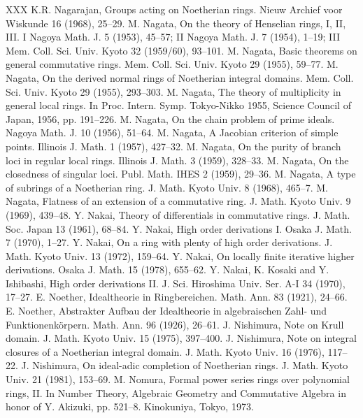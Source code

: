 \begin{thebibliography}{XXX}
 K.R. Nagarajan, Groups acting on Noetherian rings. Nieuw Archief voor Wiskunde 16 (1968), 25--29.
 M. Nagata, On the theory of Henselian rings, I, II, III. I Nagoya Math. J. 5 (1953), 45--57; II Nagoya Math. J. 7 (1954), 1--19; III Mem. Coll. Sci. Univ. Kyoto 32 (1959/60), 93--101.
 M. Nagata, Basic theorems on general commutative rings. Mem. Coll. Sci. Univ. Kyoto 29 (1955), 59--77.
 M. Nagata, On the derived normal rings of Noetherian integral domains. Mem. Coll. Sci. Univ. Kyoto 29 (1955), 293--303.
 M. Nagata, The theory of multiplicity in general local rings. In Proc. Intern. Symp. Tokyo-Nikko 1955, Science Council of Japan, 1956, pp. 191--226.
 M. Nagata, On the chain problem of prime ideals. Nagoya Math. J. 10 (1956), 51--64.
 M. Nagata, A Jacobian criterion of simple points. Illinois J. Math. 1 (1957), 427--32.
 M. Nagata, On the purity of branch loci in regular local rings. Illinois J. Math. 3 (1959), 328--33.
 M. Nagata, On the closedness of singular loci. Publ. Math. IHES 2 (1959), 29--36.
 M. Nagata, A type of subrings of a Noetherian ring. J. Math. Kyoto Univ. 8 (1968), 465--7.
 M. Nagata, Flatness of an extension of a commutative ring. J. Math. Kyoto Univ. 9 (1969), 439--48.
 Y. Nakai, Theory of differentials in commutative rings. J. Math. Soc. Japan 13 (1961), 68--84.
 Y. Nakai, High order derivations I. Osaka J. Math. 7 (1970), 1--27.
 Y. Nakai, On a ring with plenty of high order derivations. J. Math. Kyoto Univ. 13 (1972), 159--64.
 Y. Nakai, On locally finite iterative higher derivations. Osaka J. Math. 15 (1978), 655--62.
 Y. Nakai, K. Kosaki and Y. Ishibashi, High order derivations II. J. Sci. Hiroshima Univ. Ser. A-I 34 (1970), 17--27.
 E. Noether, Idealtheorie in Ringbereichen. Math. Ann. 83 (1921), 24--66.
 E. Noether, Abstrakter Aufbau der Idealtheorie in algebraischen Zahl- und Funktionenk\"orpern. Math. Ann. 96 (1926), 26--61.
 J. Nishimura, Note on Krull domain. J. Math. Kyoto Univ. 15 (1975), 397--400.
 J. Nishimura, Note on integral closures of a Noetherian integral domain. J. Math. Kyoto Univ. 16 (1976), 117--22.
 J. Nishimura, On ideal-adic completion of Noetherian rings. J. Math. Kyoto Univ. 21 (1981), 153--69.
 M. Nomura, Formal power series rings over polynomial rings, II. In Number Theory, Algebraic Geometry and Commutative Algebra in honor of Y. Akizuki, pp. 521--8. Kinokuniya, Tokyo, 1973.

\end{thebibliography}
